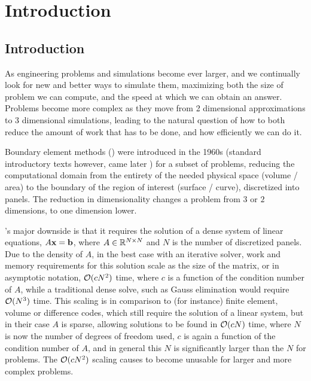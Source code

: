 
\chapter{Introduction}
\label{chapter:Introduction}
\thispagestyle{myheadings}

\section{Introduction}\label{sec:introduction}

As engineering problems and simulations become ever larger, and we continually look for new and better ways to simulate them, maximizing both the size of problem we can compute, and the speed at which we can obtain an answer. Problems become more complex as they move from 2 dimensional approximations to 3 dimensional simulations, leading to the natural question of how to both reduce the amount of work that has to be done, and how efficiently we can do it.

Boundary element methods (\bem) were introduced in the 1960s (standard introductory texts however, came later \cite{BrebbiaDominguez1992}) for a subset of problems, reducing the computational domain from the entirety of the needed physical space (volume / area) to the boundary of the region of interest (surface / curve), discretized into panels. The reduction in dimensionality changes a problem from $3$ or $2$ dimensions, to one dimension lower.

{\bem}'s major downside is that it requires the solution of a dense system of linear equations, $A\mathbf{x} = \mathbf{b}$, where $A \in \mathbb{R}^{N\times N}$ and $N$ is the number of discretized panels. Due to the density of $A$, in the best case with an iterative solver, work and memory requirements for this solution scale as the size of the matrix, or in asymptotic notation, $\mathcal{O}(cN^{2})$ time, where $c$ is a function of the condition number of $A$, while a traditional dense solve, such as Gauss elimination would require $\mathcal{O}(N^{3})$ time. This scaling is in comparison to (for instance) finite element, volume or difference codes, which still require the solution of a linear system, but in their case $A$ is sparse, allowing solutions to be found in $\mathcal{O}(cN)$ time, where $N$ is now the number of degrees of freedom used, $c$ is again a function of the condition number of $A$, and in general this $N$ is significantly larger than the $N$ for {\bem} problems. The $\mathcal{O}(cN^{2})$ scaling causes {\bem} to become unusable for larger and more complex problems.

